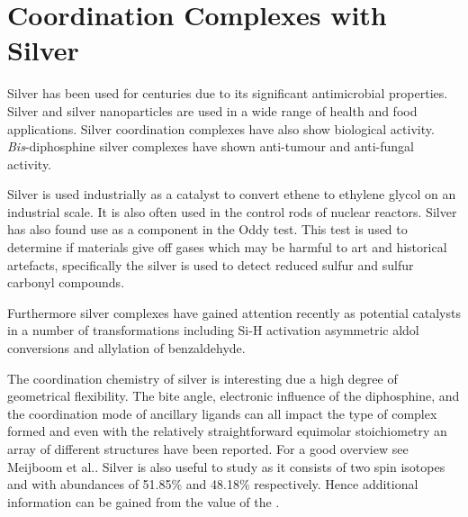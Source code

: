 
\chapter{Coordination Complexes with Silver}
\label{ch:silver}

Silver has been used for centuries due to its significant antimicrobial properties.  Silver and silver nanoparticles are used in a wide range of health and food applications.    Silver coordination complexes have also show biological activity.  \emph{Bis}-diphosphine silver complexes have shown anti-tumour and anti-fungal activity.\cite{Berners-Price1988, Liu2008}

Silver is used industrially as a catalyst to convert ethene to ethylene glycol on an industrial scale.  It is also often used in the control rods of nuclear reactors.  Silver has also found use as a component in the Oddy test.  This test is used to determine if materials give off gases which may be harmful to art and historical artefacts, specifically the silver is used to detect reduced sulfur and sulfur carbonyl compounds.  

Furthermore  silver complexes have gained attention recently as potential catalysts in a number of transformations including Si-H activation\cite{Iglesias2012} asymmetric aldol conversions \cite{Sawamura1990} and allylation of benzaldehyde\cite{Malaise2006, Yanagisawa1999}.

The coordination chemistry of silver is interesting due a high degree of geometrical flexibility. The bite angle, electronic influence of the diphosphine, and the coordination mode of ancillary ligands can all impact the type of complex formed and even with the relatively straightforward equimolar stoichiometry an array of different structures have been reported.  For a good overview see Meijboom et al.\cite{Meijboom2009}.  Silver is also useful to study as it consists of two spin  isotopes \Agseven{} and \Agnine{} with abundances of 51.85\% and 48.18\% respectively.  Hence additional information can be gained from the value of the \JAgP{}.

